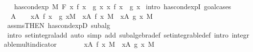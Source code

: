 \begin{isabellebody}
\ \ \ {\isachardoublequoteopen}has{\isacharunderscore}{\kern0pt}cond{\isacharunderscore}{\kern0pt}exp\ M\ F\ {\isacharparenleft}{\kern0pt}{\isasymlambda}x{\isachardot}{\kern0pt}\ f\ x\ {\isacharplus}{\kern0pt}\ g\ x{\isacharparenright}{\kern0pt}\ {\isacharparenleft}{\kern0pt}{\isasymlambda}x{\isachardot}{\kern0pt}\ f{\isacharprime}{\kern0pt}\ x\ {\isacharplus}{\kern0pt}\ g{\isacharprime}{\kern0pt}\ x{\isacharparenright}{\kern0pt}{\isachardoublequoteclose}\isanewline
%
\isadelimproof
%
\endisadelimproof
%
\isatagproof
{}\isamarkupfalse%
\ {\isacharparenleft}{\kern0pt}intro\ has{\isacharunderscore}{\kern0pt}cond{\isacharunderscore}{\kern0pt}expI{\isacharprime}{\kern0pt}{\isacharcomma}{\kern0pt}\ goal{\isacharunderscore}{\kern0pt}cases{\isacharparenright}{\kern0pt}\isanewline
\ \ \isamarkupfalse%
\ {\isacharparenleft}{\kern0pt}{}\ A{\isacharparenright}{\kern0pt}\isanewline
\ \ \isamarkupfalse%
\ {\isachardoublequoteopen}{\isasymintegral}x{\isasymin}A{\isachardot}{\kern0pt}\ {\isacharparenleft}{\kern0pt}f\ x\ {\isacharplus}{\kern0pt}\ g\ x{\isacharparenright}{\kern0pt}{\isasympartial}M\ {\isacharequal}{\kern0pt}\ {\isacharparenleft}{\kern0pt}{\isasymintegral}x{\isasymin}A{\isachardot}{\kern0pt}\ f\ x\ {\isasympartial}M{\isacharparenright}{\kern0pt}\ {\isacharplus}{\kern0pt}\ {\isacharparenleft}{\kern0pt}{\isasymintegral}x{\isasymin}A{\isachardot}{\kern0pt}\ g\ x\ {\isasympartial}M{\isacharparenright}{\kern0pt}{\isachardoublequoteclose}\ \isamarkupfalse%
\ assms{\isacharbrackleft}{\kern0pt}THEN\ has{\isacharunderscore}{\kern0pt}cond{\isacharunderscore}{\kern0pt}expD{\isacharparenleft}{\kern0pt}{}{\isacharparenright}{\kern0pt}{\isacharbrackright}{\kern0pt}\ subalg\ {}\ \isamarkupfalse%
\ {\isacharparenleft}{\kern0pt}intro\ set{\isacharunderscore}{\kern0pt}integral{\isacharunderscore}{\kern0pt}add{\isacharparenleft}{\kern0pt}{}{\isacharparenright}{\kern0pt}{\isacharcomma}{\kern0pt}\ auto\ simp\ add{\isacharcolon}{\kern0pt}\ subalgebra{\isacharunderscore}{\kern0pt}def\ set{\isacharunderscore}{\kern0pt}integrable{\isacharunderscore}{\kern0pt}def\ intro{\isacharcolon}{\kern0pt}\ integrable{\isacharunderscore}{\kern0pt}mult{\isacharunderscore}{\kern0pt}indicator{\isacharparenright}{\kern0pt}\isanewline
\ \ \isamarkupfalse%
\ \isamarkupfalse%
\ {\isachardoublequoteopen}{\isachardot}{\kern0pt}{\isachardot}{\kern0pt}{\isachardot}{\kern0pt}\ {\isacharequal}{\kern0pt}\ {\isacharparenleft}{\kern0pt}{\isasymintegral}x{\isasymin}A{\isachardot}{\kern0pt}\ f{\isacharprime}{\kern0pt}\ x\ {\isasympartial}M{\isacharparenright}{\kern0pt}\ {\isacharplus}{\kern0pt}\ {\isacharparenleft}{\kern0pt}{\isasymintegral}x{\isasymin}A{\isachardot}{\kern0pt}\ g{\isacharprime}{\kern0pt}\ x\ {\isasympartial}M{\isacharparenright}{\kern0pt}{\isachardoublequoteclose}\ \isamarkupfalse%

\end{isabellebody}
